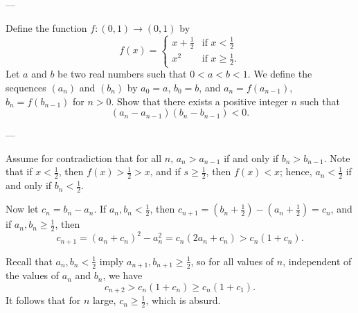 
---

Define the function $f:(0,1)\to(0,1)$ by
\[f(x)=\begin{cases}x+\frac12&\text{if }x<\frac12\\ x^2&\text{if }x\ge\frac12.\end{cases}\]
Let $a$ and $b$ be two real numbers such that $0<a<b<1$. We define the sequences $(a_n)$ and $(b_n)$ by $a_0=a$, $b_0=b$, and $a_n=f(a_{n-1})$, $b_n=f(b_{n-1})$ for $n>0$. Show that there exists a positive integer $n$ such that
\[(a_n-a_{n-1})(b_n-b_{n-1})<0.\]

---

Assume for contradiction that for all $n$, $a_n>a_{n-1}$ if and only if $b_n>b_{n-1}$. Note that if $x<\frac12$, then $f(x)>\frac12>x$, and if $s\ge\frac12$, then $f(x)<x$; hence, $a_n<\frac12$ if and only if $b_n<\frac12$.

Now let $c_n=b_n-a_n$. If $a_n,b_n<\frac12$, then $c_{n+1}=(b_n+\frac12)-(a_n+\frac12)=c_n$, and if $a_n,b_n\ge\frac12$, then
\[c_{n+1}=(a_n+c_n)^2-a_n^2=c_n(2a_n+c_n)>c_n(1+c_n).\]

Recall that $a_n,b_n<\frac12$ imply $a_{n+1},b_{n+1}\ge\frac12$, so for all values of $n$, independent of the values of $a_n$ and $b_n$, we have
\[c_{n+2}>c_n(1+c_n)\ge c_n(1+c_1).\]
It follows that for $n$ large, $c_n\ge\frac12$, which is absurd.

